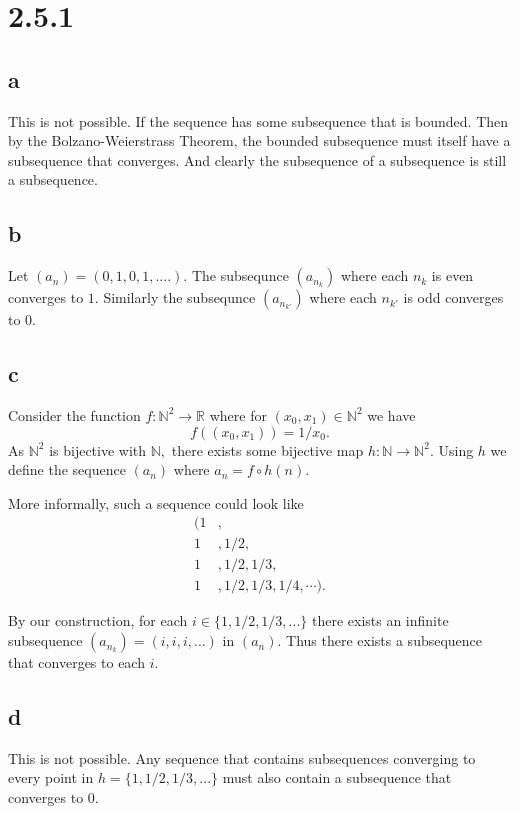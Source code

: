 \documentclass[10pt]{article}
\begin{document}
\section*{2.5.1}

\subsection*{a}

This is not possible. If the sequence has some subsequence that is bounded. Then by the Bolzano-Weierstrass Theorem, the bounded subsequence must itself have a subsequence that converges. And clearly the subsequence of a subsequence is still a subsequence.

\subsection*{b}

Let $(a_n) = (0,1,0,1,....).$ The subsequnce $(a_{n_k})$ where each $n_k$ is even converges to $1$. Similarly the subsequnce $(a_{n_{k'}})$ where each $n_{k'}$ is odd converges to $0$. 


\subsection*{c}

Consider the function $f:\mathbb{N}^2\to\mathbb{R}$ where for $(x_0,x_1)\in\mathbb{N}^2$ we have
\[f((x_0,x_1)) = 1/x_0. \]
As $\mathbb{N}^2$ is bijective with $\mathbb{N},$ there exists some bijective map $h:\mathbb{N}\to\mathbb{N}^2.$
Using $h$ we define the sequence $(a_n)$ where $a_n = f\circ h(n).$

More informally, such a sequence could look like
\begin{align*}
    (1&,\\
    1&,1/2,\\
    1&,1/2,1/3,\\
    1&,1/2,1/3,1/4,\cdots).
\end{align*}

By our construction, for each $i \in\{1,1/2,1/3,...\}$ there exists an infinite subsequence $(a_{n_k}) = (i,i,i,...)$ in $(a_n).$ Thus there exists a subsequence that converges to each $i.$

\subsection*{d}

This is not possible. Any sequence that contains subsequences converging to every point in $h=\{1,1/2,1/3,...\}$ must also contain a subsequence that converges to $0.$
\end{document}
